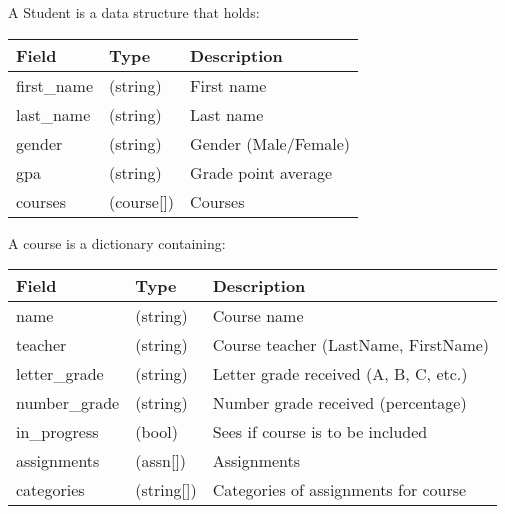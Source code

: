\documentclass[letterpaper,10pt,english]{sphinxmanual}
\begin{document}
\begin{fulllineitems}
\label{index:ps.Student}
A Student is a data structure that holds:

\begin{tabulary}{\linewidth}{|L|L|L|}
\hline
\textbf{\relax 
Field
} & \textbf{\relax 
Type
} & \textbf{\relax 
Description
}\\\hline

first\_name
 & 
(string)
 & 
First name
\\\hline

last\_name
 & 
(string)
 & 
Last name
\\\hline

gender
 & 
(string)
 & 
Gender (Male/Female)
\\\hline

gpa
 & 
(string)
 & 
Grade point average
\\\hline

courses
 & 
(course{[}{]})
 & 
Courses
\\\hline
\end{tabulary}


A course is a dictionary containing:

\begin{tabulary}{\linewidth}{|L|L|L|}
\hline
\textbf{\relax 
Field
} & \textbf{\relax 
Type
} & \textbf{\relax 
Description
}\\\hline

name
 & 
(string)
 & 
Course name
\\\hline

teacher
 & 
(string)
 & 
Course teacher (LastName, FirstName)
\\\hline

letter\_grade
 & 
(string)
 & 
Letter grade received (A, B, C, etc.)
\\\hline

number\_grade
 & 
(string)
 & 
Number grade received (percentage)
\\\hline

in\_progress
 & 
(bool)
 & 
Sees if course is to be included
\\\hline

assignments
 & 
(assn{[}{]})
 & 
Assignments
\\\hline

categories
 & 
(string{[}{]})
 & 
Categories of assignments for course
\\\hline
\end{tabulary}



\end{fulllineitems}
\end{document}
